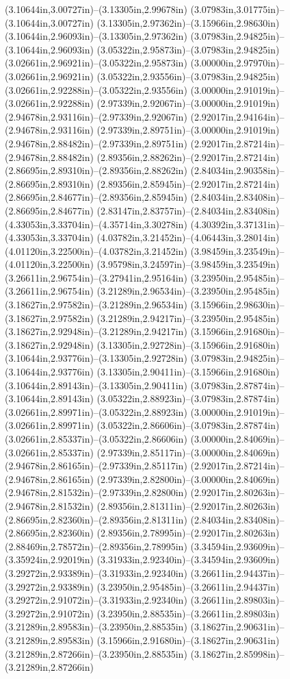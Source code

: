 (3.10644in,3.00727in)--(3.13305in,2.99678in) (3.07983in,3.01775in)--(3.10644in,3.00727in) (3.13305in,2.97362in)--(3.15966in,2.98630in) (3.10644in,2.96093in)--(3.13305in,2.97362in) (3.07983in,2.94825in)--(3.10644in,2.96093in) (3.05322in,2.95873in)--(3.07983in,2.94825in) (3.02661in,2.96921in)--(3.05322in,2.95873in) (3.00000in,2.97970in)--(3.02661in,2.96921in) (3.05322in,2.93556in)--(3.07983in,2.94825in) (3.02661in,2.92288in)--(3.05322in,2.93556in) (3.00000in,2.91019in)--(3.02661in,2.92288in) (2.97339in,2.92067in)--(3.00000in,2.91019in) (2.94678in,2.93116in)--(2.97339in,2.92067in) (2.92017in,2.94164in)--(2.94678in,2.93116in) (2.97339in,2.89751in)--(3.00000in,2.91019in) (2.94678in,2.88482in)--(2.97339in,2.89751in) (2.92017in,2.87214in)--(2.94678in,2.88482in) (2.89356in,2.88262in)--(2.92017in,2.87214in) (2.86695in,2.89310in)--(2.89356in,2.88262in) (2.84034in,2.90358in)--(2.86695in,2.89310in) (2.89356in,2.85945in)--(2.92017in,2.87214in) (2.86695in,2.84677in)--(2.89356in,2.85945in) (2.84034in,2.83408in)--(2.86695in,2.84677in) (2.83147in,2.83757in)--(2.84034in,2.83408in) (4.33053in,3.33704in)--(4.35714in,3.30278in) (4.30392in,3.37131in)--(4.33053in,3.33704in) (4.03782in,3.21452in)--(4.06443in,3.28014in) (4.01120in,3.22500in)--(4.03782in,3.21452in) (3.98459in,3.23549in)--(4.01120in,3.22500in) (3.95798in,3.24597in)--(3.98459in,3.23549in) (3.26611in,2.96754in)--(3.27941in,2.95164in) (3.23950in,2.95485in)--(3.26611in,2.96754in) (3.21289in,2.96534in)--(3.23950in,2.95485in) (3.18627in,2.97582in)--(3.21289in,2.96534in) (3.15966in,2.98630in)--(3.18627in,2.97582in) (3.21289in,2.94217in)--(3.23950in,2.95485in) (3.18627in,2.92948in)--(3.21289in,2.94217in) (3.15966in,2.91680in)--(3.18627in,2.92948in) (3.13305in,2.92728in)--(3.15966in,2.91680in) (3.10644in,2.93776in)--(3.13305in,2.92728in) (3.07983in,2.94825in)--(3.10644in,2.93776in) (3.13305in,2.90411in)--(3.15966in,2.91680in) (3.10644in,2.89143in)--(3.13305in,2.90411in) (3.07983in,2.87874in)--(3.10644in,2.89143in) (3.05322in,2.88923in)--(3.07983in,2.87874in) (3.02661in,2.89971in)--(3.05322in,2.88923in) (3.00000in,2.91019in)--(3.02661in,2.89971in) (3.05322in,2.86606in)--(3.07983in,2.87874in) (3.02661in,2.85337in)--(3.05322in,2.86606in) (3.00000in,2.84069in)--(3.02661in,2.85337in) (2.97339in,2.85117in)--(3.00000in,2.84069in) (2.94678in,2.86165in)--(2.97339in,2.85117in) (2.92017in,2.87214in)--(2.94678in,2.86165in) (2.97339in,2.82800in)--(3.00000in,2.84069in) (2.94678in,2.81532in)--(2.97339in,2.82800in) (2.92017in,2.80263in)--(2.94678in,2.81532in) (2.89356in,2.81311in)--(2.92017in,2.80263in) (2.86695in,2.82360in)--(2.89356in,2.81311in) (2.84034in,2.83408in)--(2.86695in,2.82360in) (2.89356in,2.78995in)--(2.92017in,2.80263in) (2.88469in,2.78572in)--(2.89356in,2.78995in) (3.34594in,2.93609in)--(3.35924in,2.92019in) (3.31933in,2.92340in)--(3.34594in,2.93609in) (3.29272in,2.93389in)--(3.31933in,2.92340in) (3.26611in,2.94437in)--(3.29272in,2.93389in) (3.23950in,2.95485in)--(3.26611in,2.94437in) (3.29272in,2.91072in)--(3.31933in,2.92340in) (3.26611in,2.89803in)--(3.29272in,2.91072in) (3.23950in,2.88535in)--(3.26611in,2.89803in) (3.21289in,2.89583in)--(3.23950in,2.88535in) (3.18627in,2.90631in)--(3.21289in,2.89583in) (3.15966in,2.91680in)--(3.18627in,2.90631in) (3.21289in,2.87266in)--(3.23950in,2.88535in) (3.18627in,2.85998in)--(3.21289in,2.87266in) 